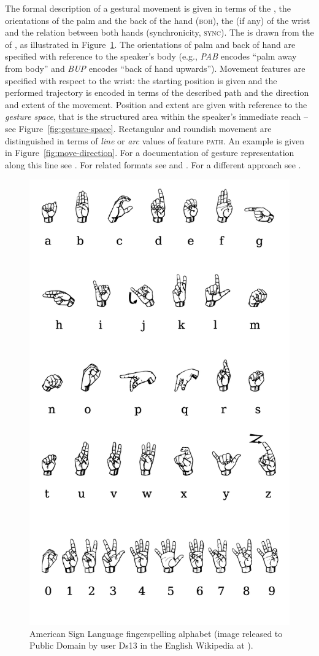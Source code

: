 \documentclass[output=paper]{langsci/langscibook}
\begin{document}
The formal description of a gestural movement is given in terms of the ,  the orientations of the palm  and the back of the hand (\textsc{boh}),  the  (if any) of the wrist  and the relation between both hands (synchronicity, \textsc{sync}). 
%
The  is drawn from the  of , as illustrated in Figure~\ref{fig:asl}.
%
The orientations  of palm and back of hand are specified with reference to the speaker's body (e.g., \textit{PAB} encodes \enquote{palm away from body} and \textit{BUP} encodes \enquote{back of hand upwards}). 
%
Movement features are specified with respect to the wrist: the starting position  is given and the performed trajectory is encoded in terms of the described path  and the direction  and extent  of the movement.
%
Position and extent are given with reference to the \emph{gesture space}, that is the structured area within the speaker's immediate reach \citep[--89]{McNeill:1992} -- see Figure~\ref{fig:gesture-space}. 
%
Rectangular and roundish movement are distinguished in terms of \textit{line}  or \textit{arc}  values of feature \textsc{path}.
%
An example is given in Figure~\ref{fig:move-direction}.
%
For a documentation of gesture representation along this line see \citet{FIGURE:annotation}.
%
For related formats see \citet{Martell:2002} and \citet{Gibbon:et:al:2003}.
%
For a different approach see \citet{Lausberg:Sloetjes:2009}.


\begin{figure}[tb]
  \centering
  \includegraphics[width=0.5\linewidth]{figures/ASL_alphabet_gallaudet}
  \caption[ASL]{American Sign Language fingerspelling alphabet (image released to Public Domain by user Ds13 in the English Wikipedia at ).}
  \label{fig:asl}
\end{figure}
\end{document}
